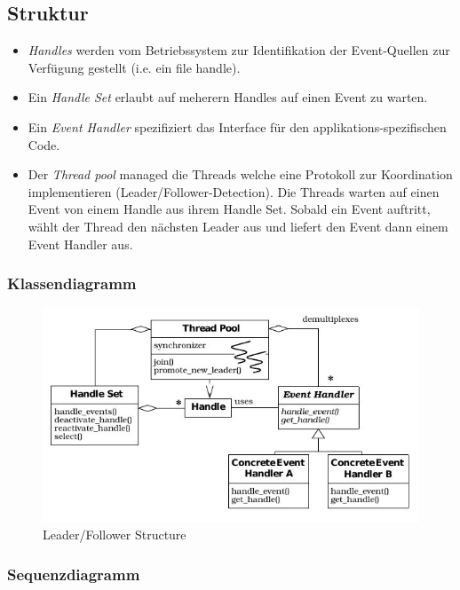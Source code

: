 \subsection*{Struktur}

\begin{itemize}
	\item \emph{Handles} werden vom Betriebssystem zur Identifikation der Event-Quellen zur Verfügung gestellt (i.e. ein file handle).
	\item Ein \emph{Handle Set} erlaubt auf meherern Handles auf einen Event zu warten.
	\item Ein \emph{Event Handler} spezifiziert das Interface für den applikations-spezifischen Code.
	\item Der \emph{Thread pool} managed die Threads welche eine Protokoll zur Koordination implementieren (Leader/Follower-Detection). Die Threads warten auf einen Event von einem Handle aus ihrem Handle Set. Sobald ein Event auftritt, wählt der Thread den nächsten Leader aus und liefert den Event dann einem Event Handler aus.
\end{itemize}

\subsubsection*{Klassendiagramm}

\begin{figure}[H]
	\centering
	\includegraphics[width=\textwidth]{content/posa2/leader-followers/images/leaderFollowerStructure.jpeg}
	\caption{Leader/Follower Structure}
\end{figure}


\subsubsection*{Sequenzdiagramm}


